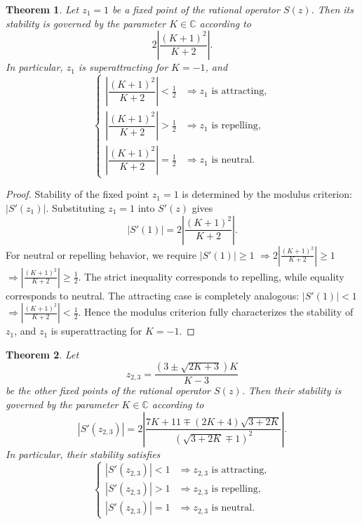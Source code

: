 \documentclass{article}
\newtheorem{theorem}{Theorem}[section]
\theoremstyle{definition}
\theoremstyle{remark}
\begin{document}
\begin{theorem}\label{thm:z1}
	Let \( z_{1} = 1 \) be a fixed point of the rational operator \( S(z) \).
	Then its stability is governed by the parameter \( K \in \mathbb{C} \) according to
	\[
	2 \left| \frac{(K+1)^2}{K+2} \right|.
	\]
	In particular, $z_1$ is superattracting for $K=-1$, and
	\[
	\begin{cases}
		\left| \dfrac{(K+1)^2}{K+2} \right|  <  \frac{1}{2}  & \Rightarrow z_{1} \text{ is attracting}, \\[10pt]
		\left| \dfrac{(K+1)^2}{K+2} \right|  >  \frac{1}{2}  & \Rightarrow z_{1} \text{ is repelling}, \\[10pt]
		\left| \dfrac{(K+1)^2}{K+2} \right|  =  \frac{1}{2}  & \Rightarrow z_{1} \text{ is neutral}.
	\end{cases}
	\]
\end{theorem}

\begin{proof} Stability of the fixed point \(z_1 = 1\) is determined by the modulus criterion: \( |S'(z_1)| \). Substituting \(z_1 = 1\) into \(S'(z)\) gives \[ |S'(1)| = 2 \left| \frac{(K+1)^2}{K+2} \right|. \] For neutral or repelling behavior, we require \( |S'(1)| \ge 1 \) \(\Rightarrow 2 \left| \frac{(K+1)^2}{K+2} \right| \ge 1 \) \(\Rightarrow \left| \frac{(K+1)^2}{K+2} \right| \ge \frac{1}{2}. \) The strict inequality corresponds to repelling, while equality corresponds to neutral. The attracting case is completely analogous: \( |S'(1)| < 1 \) \(\Rightarrow \left| \frac{(K+1)^2}{K+2} \right| < \frac{1}{2}. \) Hence the modulus criterion fully characterizes the stability of \(z_1\), and \(z_1\) is superattracting for \(K=-1\). \end{proof}


\begin{theorem}\label{thm:z23}
	Let
	\[
	z_{2,3} = \frac{(3 \pm \sqrt{2K+3})K}{K-3}
	\]
	be the other fixed points of the rational operator \(S(z)\).
	Then their stability is governed by the parameter \(K \in \mathbb{C}\) according to
	\begin{equation}\label{eq:modulus-z23}
		\left| S'(z_{2,3}) \right| = 2\left| \frac{7K + 11 \mp (2K + 4)\sqrt{3+2K}}{\left(\sqrt{3+2K}\mp1\right)^2}\right| .
	\end{equation}
	In particular, their stability satisfies
	\[
	\begin{cases}
		\left| S'(z_{2,3}) \right| < 1 & \Rightarrow z_{2,3} \text{ is attracting}, \\[2mm]
		\left| S'(z_{2,3}) \right| > 1 & \Rightarrow z_{2,3} \text{ is repelling}, \\[1mm]
		\left| S'(z_{2,3}) \right| = 1 & \Rightarrow z_{2,3} \text{ is neutral}.
	\end{cases}
	\]
\end{theorem}
\end{document}
